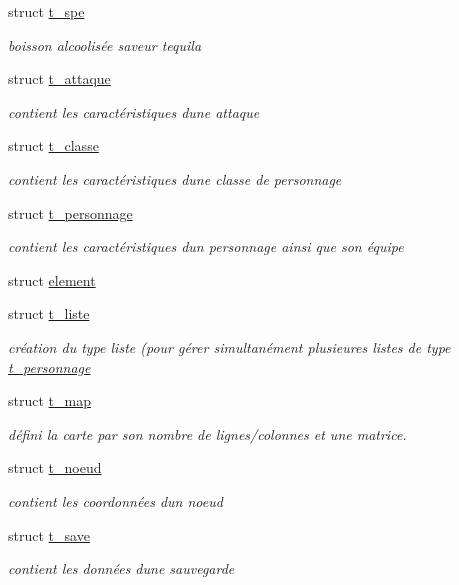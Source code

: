 \begin{DoxyCompactItemize}
\item 
struct \hyperlink{a00012}{t\+\_\+spe}
\begin{DoxyCompactList}\small\item\em boisson alcoolisée saveur tequila \end{DoxyCompactList}\item 
struct \hyperlink{a00004}{t\+\_\+attaque}
\begin{DoxyCompactList}\small\item\em contient les caractéristiques d\textquotesingle{}une attaque \end{DoxyCompactList}\item 
struct \hyperlink{a00005}{t\+\_\+classe}
\begin{DoxyCompactList}\small\item\em contient les caractéristiques d\textquotesingle{}une classe de personnage \end{DoxyCompactList}\item 
struct \hyperlink{a00010}{t\+\_\+personnage}
\begin{DoxyCompactList}\small\item\em contient les caractéristiques d\textquotesingle{}un personnage ainsi que son équipe \end{DoxyCompactList}\item 
struct \hyperlink{a00003}{element}
\item 
struct \hyperlink{a00007}{t\+\_\+liste}
\begin{DoxyCompactList}\small\item\em création du type liste (pour gérer simultanément plusieures listes de type \hyperlink{a00010}{t\+\_\+personnage} \end{DoxyCompactList}\item 
struct \hyperlink{a00008}{t\+\_\+map}
\begin{DoxyCompactList}\small\item\em défini la carte par son nombre de lignes/colonnes et une matrice. \end{DoxyCompactList}\item 
struct \hyperlink{a00009}{t\+\_\+noeud}
\begin{DoxyCompactList}\small\item\em contient les coordonnées d\textquotesingle{}un noeud \end{DoxyCompactList}\item 
struct \hyperlink{a00011}{t\+\_\+save}
\begin{DoxyCompactList}\small\item\em contient les données d\textquotesingle{}une sauvegarde \end{DoxyCompactList}\end{DoxyCompactItemize}
